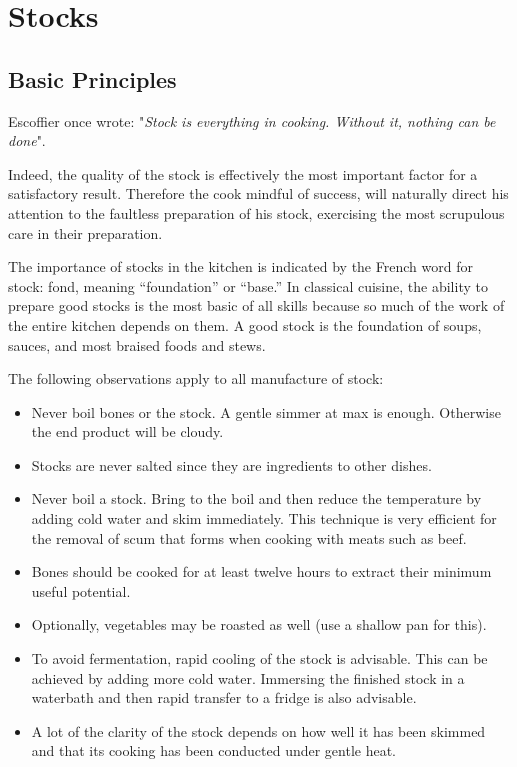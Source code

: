 \chapter{Stocks}
\minitoc

\section {Basic Principles} 

Escoffier once wrote: "\emph{Stock is everything in cooking.  Without it, nothing can be done}".  

Indeed, the quality of the stock is effectively the most important factor for a satisfactory result.  Therefore the cook mindful of success, will naturally direct his attention to the faultless preparation of his stock, exercising the most scrupulous care in their preparation.  

The importance of stocks in the kitchen is indicated by the French word for stock: fond, meaning “foundation” or “base.” In classical cuisine, the ability to prepare good stocks is the most basic of all skills because so much of the work of the entire kitchen depends on them. A good stock is the foundation of soups, sauces, and most braised foods and stews.

The following observations apply to all manufacture of stock:
\begin{itemize}
\item Never boil bones or the stock.  A gentle simmer at max  is enough. Otherwise the end product will be cloudy.
\item Stocks are never salted since they are ingredients to other dishes.
\item Never boil a stock.  Bring to the boil and then reduce the temperature by adding cold water and skim immediately.  This technique is very efficient for the removal of scum that forms when cooking with meats such as beef.
\item Bones should be cooked for at least twelve hours to extract their minimum useful potential.
\item Optionally, vegetables may be roasted as well (use a shallow pan for this).
\item To avoid fermentation, rapid cooling of the stock is advisable.  This can be achieved by adding more cold water.  Immersing the finished stock in a waterbath and then rapid transfer to a fridge is also advisable.
\item A lot of the clarity of the stock depends on how well it has been skimmed and that its cooking has been conducted under gentle heat. 
\end{itemize}  




